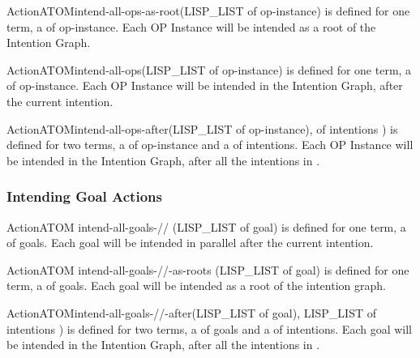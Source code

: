 \begin{typeefa}{Action}{ATOM}{intend-all-ops-as-root}{(LISP\_LIST of op-instance)}
is defined for one term, a  of op-instance. Each OP
Instance will be intended as a root of the Intention Graph.
\end{typeefa}

\begin{typeefa}{Action}{ATOM}{intend-all-ops}{(LISP\_LIST of op-instance)}
is defined for one term, a  of op-instance. Each OP Instance will be
intended in the Intention Graph, after the current intention.
\end{typeefa}

\begin{typeefa}{Action}{ATOM}{intend-all-ops-after}{(LISP\_LIST of op-instance),
 of intentions )} is defined for two terms, a  of
op-instance and  a  of intentions. Each OP Instance will be
intended in the Intention Graph, after all the intentions in .
\end{typeefa}

\subsubsection{Intending Goal Actions}

\begin{typeefa}{Action}{ATOM} {intend-all-goals-//} {(LISP\_LIST of goal)}
is defined for one term, a  of goals. Each goal will be intended
in parallel after the current intention.
\end{typeefa}

\begin{typeefa}{Action}{ATOM} {intend-all-goals-//-as-roots} {(LISP\_LIST of
goal)}
is defined for one term, a  of goals.
Each goal will be intended as a root of the intention graph.
\end{typeefa}

\begin{typeefa}{Action}{ATOM}{intend-all-goals-//-after}{(LISP\_LIST of goal),
LISP\_LIST of intentions )} is defined for two terms, a  of
goals and  a  of intentions. Each goal will be intended in
the Intention Graph, after all the intentions in .
\end{typeefa}

